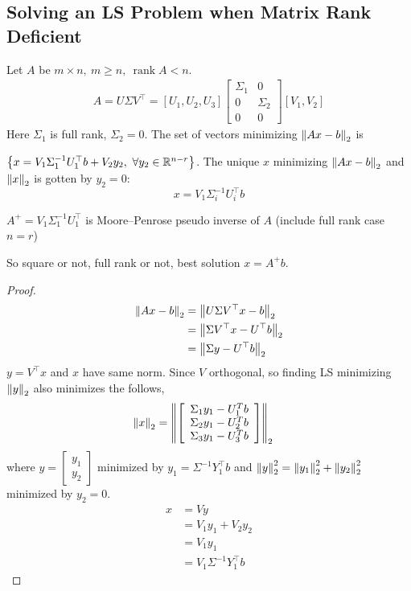 \documentclass[11pt]{article}
\numberwithin{equation}{section}
\begin{document}
\subsection{Solving an LS Problem when Matrix Rank Deficient}
\begin{theorem}
    Let $A$ be $m \times n, \ m \geq n, \ \operatorname{rank}A < n$. \begin{align*}
        A = U \Sigma V^{\top} = \left[ U_1, U_2, U_3 \right] \left[\begin{array}{ll}
            \Sigma_{1} & 0 \\
            0 & \Sigma_{2} \\
            0 & 0
            \end{array}\right] \left[ V_1, V_2 \right]
    \end{align*}
    Here $\Sigma_1$ is full rank, $\Sigma_2=0$. The set of vectors minimizing $\left\| Ax-b \right\|_2$ is 
    
    $\left\{ x=V_1 \Sigma_1^{-1} U^\top_1 b + V_2 y_2, \ \forall y_2 \in \mathbb R^{n-r}  \right\}$. The unique $x$ minimizing $\left\| Ax-b \right\|_2$ and $\left\| x \right\|_2$ is gotten by $y_2 = 0$:
    $$x=V_{1} \Sigma_{i}^{-1} U_{i}^{\top} b$$
\end{theorem}
\begin{definition}
    $A^{+} = V_{1} \Sigma_{1}^{-1} U_{1}^{\top}$ is Moore–Penrose pseudo inverse of $A$ (include full rank case $n=r$)
\end{definition}
So square or not, full rank or not, best solution $x=A^+ b$.
\begin{proof}
    \begin{align*}
        \left\| Ax-b \right\|_2 &= \left\| U\Sigma V^\top x -b  \right\|_2 \\
        &= \left\| \Sigma V^\top x - U^\top b  \right\|_2 \\
        &= \left\| \Sigma y - U^\top b  \right\|_2 \\
    \end{align*}
    $y=V^\top x$ and $x$ have same norm. Since $V$ orthogonal, so finding LS minimizing $\left\| y \right\|_2$ also minimizes the follows, \begin{align*}
        \left\| x \right\|_2 &= \left\| \left[\begin{array}{l}
            \Sigma_1 y_{1}-U_{1}^{T} b \\
            \Sigma_2 y_{1}-U_{2}^{T} b \\
            \Sigma_3 y_{1}-U_{3}^{T} b 
            \end{array}\right] \right\|_2
    \end{align*}
    where $y=\left[\begin{array}{l}
        y_{1} \\
        y_{2}
        \end{array}\right]$ minimized by $y_1=\Sigma^{-1}Y_1^\top b$ and $\left\| y \right\|_2^2=\left\| y_1 \right\|_2^2 + \left\| y_2 \right\|_2^2$ minimized by $y_2=0$.\begin{align*}
            x &= Vy \\
            &= V_1 y_1 + V_2 y_2 \\
            &= V_1 y_1 \\
            &= V_1 \Sigma^{-1}Y_1^\top b
        \end{align*}
\end{proof}
\end{document}
